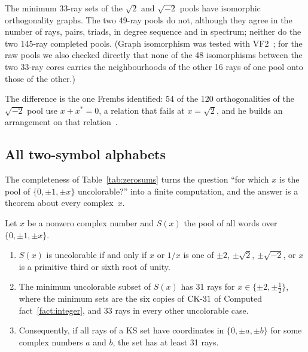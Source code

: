 \begin{fact}\label{fact:pools}
The minimum 33-ray sets of the $\sqrt2$ and $\sqrt{-2}$ pools have isomorphic orthogonality
graphs.  The two 49-ray pools do not, although they agree in the number of rays, pairs, triads,
in degree sequence and in spectrum; neither do the two 145-ray completed pools.  (Graph
isomorphism was tested with VF2~\cite{Cordella2004VF2}; for the raw pools we also checked directly
that none of the 48 isomorphisms between the two 33-ray cores carries the neighbourhoods of the
other 16 rays of one pool onto those of the other.)
\end{fact}

The difference is the one Frembs identified: 54 of the 120 orthogonalities of the $\sqrt{-2}$
pool use $x+x^{*}=0$, a relation that fails at $x=\sqrt2$, and he builds an arrangement on that
relation~\cite{Frembs2026}.

\subsection{All two-symbol alphabets}\label{sec:twosymbol}

The completeness of Table~\ref{tab:zerosums} turns the question ``for which $x$ is the pool of
$\{0,\pm1,\pm x\}$ uncolorable?'' into a finite computation, and the answer is a theorem about
every complex~$x$.

\begin{theorem}\label{thm:twosymbol}
Let $x$ be a nonzero complex number and $S(x)$ the pool of all words over $\{0,\pm1,\pm x\}$.
\begin{enumerate}[label=(\roman*)]
\item $S(x)$ is uncolorable if and only if $x$ or $1/x$ is one of $\pm2$, $\pm\sqrt2$,
$\pm\sqrt{-2}$, or $x$ is a primitive third or sixth root of unity.
\item The minimum uncolorable subset of $S(x)$ has 31 rays for $x\in\{\pm2,\pm\tfrac12\}$, where
the minimum sets are the six copies of $\mathrm{CK}\text{-}31$ of Computed fact~\ref{fact:integer}, and 33 rays in
every other uncolorable case.
\item Consequently, if all rays of a KS set have coordinates in $\{0,\pm a,\pm b\}$ for some
complex numbers $a$ and $b$, the set has at least 31 rays.
\end{enumerate}
\end{theorem}

